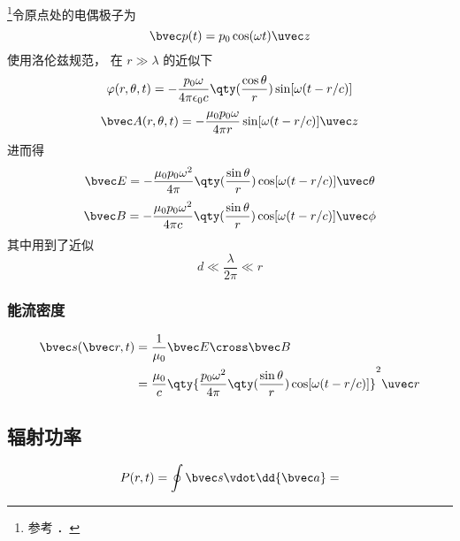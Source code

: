 
\begin{issues}
\issueDraft
\end{issues}


\footnote{参考 \cite{GriffE}．}令原点处的电偶极子为
\begin{equation}
\bvec p(t) = p_0 \cos(\omega t) \uvec z
\end{equation}
使用洛伦兹规范， 在 $r \gg \lambda$ 的近似下
\begin{equation}
\varphi(r, \theta, t) = -\frac{p_0\omega}{4\pi\epsilon_0 c} \qty(\frac{\cos\theta}{r}) \sin[\omega(t - r/c)]
\end{equation}
\begin{equation}
\bvec A(r, \theta, t) = -\frac{\mu_0 p_0 \omega}{4\pi r} \sin[\omega(t - r/c)]\uvec z
\end{equation}
进而得
\begin{equation}
\bvec E = -\frac{\mu_0 p_0\omega^2}{4\pi} \qty(\frac{\sin\theta}{r})\cos[\omega(t - r/c)]\uvec \theta
\end{equation}
\begin{equation}
\bvec B = -\frac{\mu_0 p_0\omega^2}{4\pi c} \qty(\frac{\sin\theta}{r})\cos[\omega(t - r/c)]\uvec \phi
\end{equation}
其中用到了近似
\begin{equation}
d \ll \frac{\lambda}{2\pi} \ll r
\end{equation}

\subsubsection{能流密度}
\begin{equation}
\begin{aligned}
\bvec s(\bvec r, t) &= \frac{1}{\mu_0} \bvec E \cross \bvec B\\
&= \frac{\mu_0}{c} \qty{\frac{p_0\omega^2}{4\pi} \qty(\frac{\sin\theta}{r}) \cos[\omega(t - r/c)]}^2 \uvec r
\end{aligned}
\end{equation}

\subsection{辐射功率}
\begin{equation}
P(r, t) = \oint \bvec s \vdot \dd{\bvec a} = 
\end{equation}
